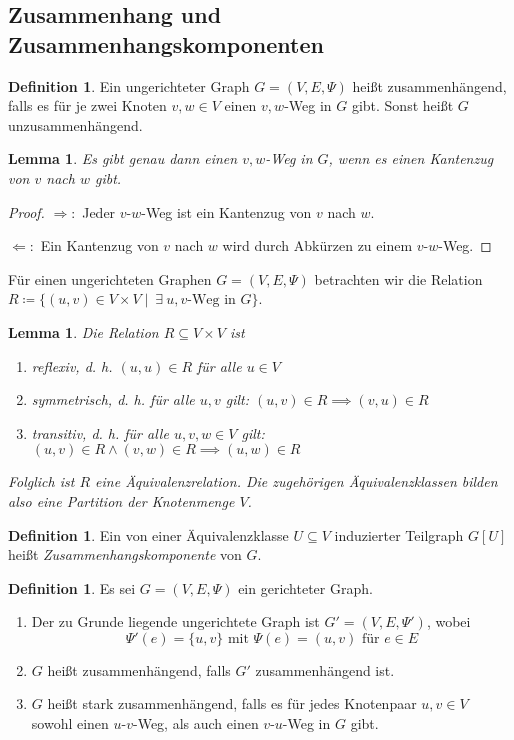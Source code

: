 \documentclass[a4paper,12pt]{article}
\newtheorem{lemma}[axiom]{Lemma}
\theoremstyle{definition}
\newtheorem{definition}[axiom]{Definition}
\let\oldexist\exists
\renewcommand{\exists}{\:\oldexist \: }
\begin{document}
	\subsection{Zusammenhang und Zusammenhangskomponenten}
	\begin{definition}
		Ein ungerichteter Graph $G = (V, E, \Psi)$ heißt zusammenhängend, falls es für je zwei Knoten $v, w \in V$ einen $v, w$-Weg in $G$ gibt. Sonst heißt $G$ unzusammenhängend.
	\end{definition}
	\begin{lemma}
		Es gibt genau dann einen $v, w$-Weg in $G$, wenn es einen Kantenzug von $v$ nach $w$ gibt.
	\end{lemma}
	\begin{proof}
		$\Longrightarrow:$ Jeder $v$-$w$-Weg ist ein Kantenzug von $v$ nach $w$.
		
		$\Longleftarrow:$ Ein Kantenzug von $v$ nach $w$ wird durch Abkürzen zu einem $v$-$w$-Weg.
	\end{proof}
	Für einen ungerichteten Graphen $G = (V, E, \Psi)$ betrachten wir die Relation $R \coloneq \{(u, v) \in V \times V \mid \exists u, v\text{-Weg in }G\}$.
	\begin{lemma}
		Die Relation $R \subseteq V \times V$ ist
		\begin{enumerate}[label=(\roman*)]
			\item reflexiv, d. h. $(u, u) \in R$ für alle $u \in V$
			\item symmetrisch, d. h. für alle $u, v$ gilt: $(u, v) \in R \implies (v, u) \in R$
			\item transitiv, d. h. für alle $u, v, w \in V$ gilt: $(u, v) \in R \land (v, w) \in R \implies (u, w) \in R$ 
		\end{enumerate}
		Folglich ist $R$ eine Äquivalenzrelation. Die zugehörigen Äquivalenzklassen bilden also eine Partition der Knotenmenge $V$.
	\end{lemma}
	\begin{definition}
		Ein von einer Äquivalenzklasse $U \subseteq V$ induzierter Teilgraph $G[U]$ heißt {\itshape Zusammenhangskomponente} von $G$.
	\end{definition}
	\begin{definition}
		Es sei $G = (V, E, \Psi)$ ein gerichteter Graph.
		\begin{enumerate}[label=(\roman*)]
			\item Der zu Grunde liegende ungerichtete Graph ist $G' = (V, E, \Psi')$, wobei
			\[
				\Psi'(e) = \{u, v\} \text{ mit } \Psi(e) = (u, v) \text{ für } e \in E
			\]
			\item $G$ heißt zusammenhängend, falls $G'$ zusammenhängend ist.
			\item $G$ heißt stark zusammenhängend, falls es für jedes Knotenpaar $u, v \in V$ sowohl einen $u$-$v$-Weg, als auch einen $v$-$u$-Weg in $G$ gibt.
		\end{enumerate}
	\end{definition}
\end{document}
